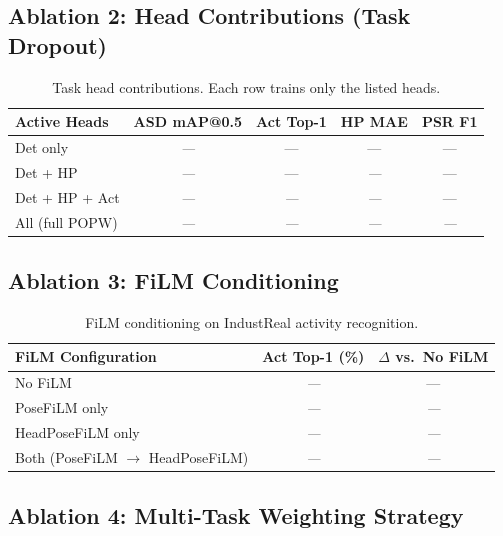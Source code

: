 \documentclass[10pt,journal,compsoc]{IEEEtran}
\newcommand{\popw}{POPW}
\newcommand{\todo}{\textit{---}}
\newcommand{\popwres}{\todo}
\begin{document}
\subsection{Ablation 2: Head Contributions (Task Dropout)}

\begin{table}[htbp]
\centering
\small
\caption{Task head contributions. Each row trains only the listed heads.}
\label{tab:abl-heads}
\begin{tabular}{l c c c c}
\toprule
\textbf{Active Heads} & \textbf{ASD mAP@0.5} & \textbf{Act Top-1} & \textbf{HP MAE} & \textbf{PSR F1} \\
\midrule
Det only & \popwres & --- & --- & --- \\
Det + HP & \popwres & --- & \popwres & --- \\
Det + HP + Act & \popwres & \popwres & \popwres & --- \\
All (full \popw{}) & \popwres & \popwres & \popwres & \popwres \\
\bottomrule
\end{tabular}
\end{table}

\subsection{Ablation 3: FiLM Conditioning}

\begin{table}[htbp]
\centering
\small
\caption{FiLM conditioning on IndustReal activity recognition.}
\label{tab:abl-film}
\begin{tabular}{l c c}
\toprule
\textbf{FiLM Configuration} & \textbf{Act Top-1 (\%)} & \textbf{$\Delta$ vs.\ No FiLM} \\
\midrule
No FiLM & \popwres & --- \\
PoseFiLM only & \popwres & \popwres \\
HeadPoseFiLM only & \popwres & \popwres \\
Both (PoseFiLM $\rightarrow$ HeadPoseFiLM) & \popwres & \popwres \\
\bottomrule
\end{tabular}
\end{table}

\subsection{Ablation 4: Multi-Task Weighting Strategy}
\end{document}
